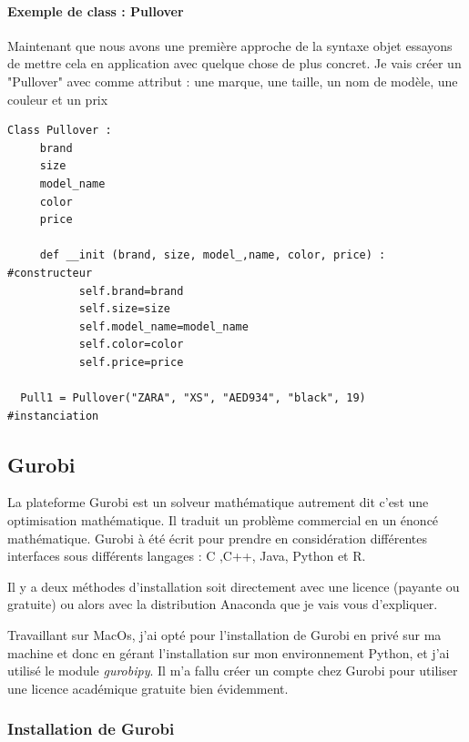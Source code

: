 \documentclass[a4paper, 12pt, twoside]{article}
\begin{document}
\paragraph{Exemple de class : Pullover}{Maintenant que nous avons une première approche de la syntaxe objet essayons de mettre cela en application avec quelque chose de plus concret. Je vais créer un "Pullover" avec comme attribut : une marque, une taille, un nom de modèle, une couleur et un prix }
\begin{verbatim}
Class Pullover : 
     brand
     size
     model_name
     color
     price
   
     def __init (brand, size, model_,name, color, price) :       #constructeur
           self.brand=brand
           self.size=size
           self.model_name=model_name
           self.color=color
           self.price=price
          
  Pull1 = Pullover("ZARA", "XS", "AED934", "black", 19)         #instanciation  
\end{verbatim}
\newpage
\subsection{Gurobi}
La plateforme Gurobi est un solveur mathématique autrement dit c'est une optimisation mathématique. Il traduit un problème commercial en un énoncé mathématique. Gurobi à été écrit pour prendre en considération différentes interfaces sous différents langages : \textsf{C ,C++, Java, Python et R}. \newline

Il y a deux méthodes d'installation soit directement avec une licence (payante ou gratuite) ou alors avec  la distribution \textsf{Anaconda} que je vais vous d'expliquer. \newline

Travaillant sur MacOs, j'ai opté pour l'installation de \textsf{Gurobi} en privé sur ma machine et donc en gérant l'installation sur mon environnement Python, et j'ai utilisé le module \emph{gurobipy}. Il m'a fallu créer un compte chez \textsf{Gurobi} pour utiliser une licence académique gratuite bien évidemment. 

\subsubsection{Installation de Gurobi}
\end{document}
